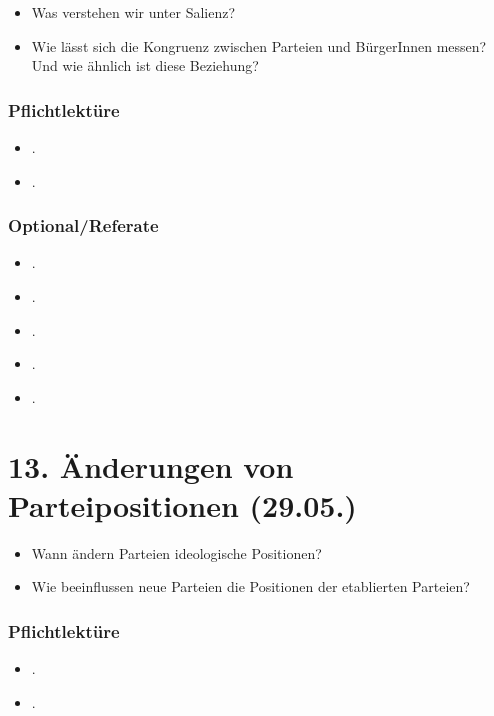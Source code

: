 \documentclass[abstract=on,parskip=full,headings=standardclasses,fontsize=11pt,paper=a4]{scrartcl}
\begin{document}
\begin{itemize}
\renewcommand\labelitemi{--}
\item Was verstehen wir unter Salienz?
\item Wie lässt sich die Kongruenz zwischen Parteien und BürgerInnen messen? Und wie ähnlich ist diese Beziehung?
\end{itemize}

\subsubsection*{Pflichtlektüre}
\begin{itemize}
\item {}.
\item {}.
\end{itemize}

\subsubsection*{Optional/Referate}
\begin{itemize}
\item {}.
\item {}.
\item {}.
\item {}.
\item {}.
\end{itemize}


\section{13. Änderungen von Parteipositionen (29.05.)}

\begin{itemize}
\renewcommand\labelitemi{--}
\item Wann ändern Parteien ideologische Positionen?
\item Wie beeinflussen neue Parteien die Positionen der etablierten Parteien?
\end{itemize}


\subsubsection*{Pflichtlektüre}
\begin{itemize}
\item {}.
\item {}.
\end{itemize}
\end{document}
